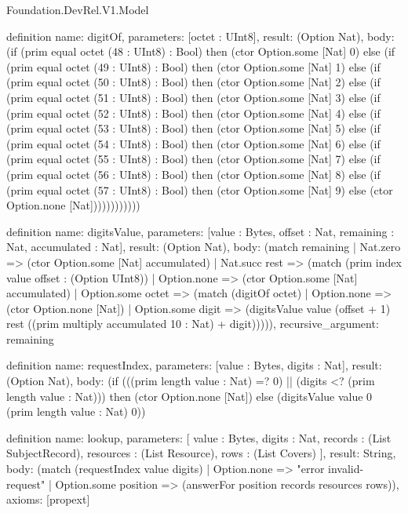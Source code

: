 \begin{lexlean}{Foundation.DevRel.V1.Model}
\begin{semanticmodule}
definition{
  name: digitOf,
  parameters: [octet : UInt8],
  result: (Option Nat),
  body: (if (prim equal octet (48 : UInt8) : Bool) then (ctor Option.some [Nat] 0) else (if (prim equal octet (49 : UInt8) : Bool) then (ctor Option.some [Nat] 1) else (if (prim equal octet (50 : UInt8) : Bool) then (ctor Option.some [Nat] 2) else (if (prim equal octet (51 : UInt8) : Bool) then (ctor Option.some [Nat] 3) else (if (prim equal octet (52 : UInt8) : Bool) then (ctor Option.some [Nat] 4) else (if (prim equal octet (53 : UInt8) : Bool) then (ctor Option.some [Nat] 5) else (if (prim equal octet (54 : UInt8) : Bool) then (ctor Option.some [Nat] 6) else (if (prim equal octet (55 : UInt8) : Bool) then (ctor Option.some [Nat] 7) else (if (prim equal octet (56 : UInt8) : Bool) then (ctor Option.some [Nat] 8) else (if (prim equal octet (57 : UInt8) : Bool) then (ctor Option.some [Nat] 9) else (ctor Option.none [Nat])))))))))))
}

definition{
  name: digitsValue,
  parameters: [value : Bytes, offset : Nat, remaining : Nat, accumulated : Nat],
  result: (Option Nat),
  body: (match remaining
    | Nat.zero => (ctor Option.some [Nat] accumulated)
    | Nat.succ rest => (match (prim index value offset : (Option UInt8))
      | Option.none => (ctor Option.some [Nat] accumulated)
      | Option.some octet => (match (digitOf octet)
        | Option.none => (ctor Option.none [Nat])
        | Option.some digit => (digitsValue value (offset + 1) rest ((prim multiply accumulated 10 : Nat) + digit))))),
  recursive_argument: remaining
}

definition{
  name: requestIndex,
  parameters: [value : Bytes, digits : Nat],
  result: (Option Nat),
  body: (if (((prim length value : Nat) =? 0) || (digits <? (prim length value : Nat))) then (ctor Option.none [Nat]) else (digitsValue value 0 (prim length value : Nat) 0))
}

definition{
  name: lookup,
  parameters: [
    value : Bytes,
    digits : Nat,
    records : (List SubjectRecord),
    resources : (List Resource),
    rows : (List Covers)
  ],
  result: String,
  body: (match (requestIndex value digits)
    | Option.none => "error invalid-request"
    | Option.some position => (answerFor position records resources rows)),
  axioms: [propext]
}
\end{semanticmodule}
\end{lexlean}
